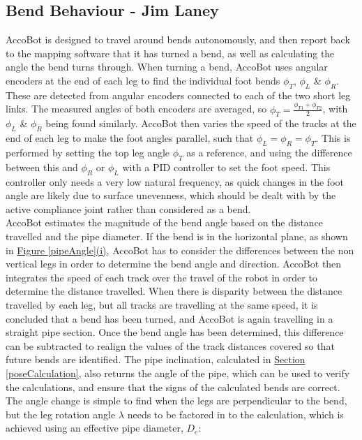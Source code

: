 \documentclass[11pt]{article}		%
\newcommand{\sectref}[1]{\hyperref[#1]{Section \ref*{#1}}}     %
\begin{document}
		\subsection[Bend Behaviour]{Bend Behaviour - Jim Laney}
			
			\begin{floatingfigure}[r]{0pt} \end{floatingfigure}
			
			AccoBot is designed to travel around bends autonomously, and then report back to the mapping software that it has turned a bend, as well as calculating the angle the bend turns through.
			When turning a bend, AccoBot uses angular encoders at the end of each leg to find the individual foot bends $\phi_T$, $\phi_L$ \& $\phi_R$.
			These are detected from angular encoders connected to each of the two short leg links.
			The measured angles of both encoders are averaged, so $\phi_T = \frac{\phi_{T1} + \phi_{T2}}{2}$, with $\phi_L$ \& $\phi_R$ being found similarly.
			AccoBot then varies the speed of the tracks at the end of each leg to make the foot angles parallel, such that $\phi_L = \phi_R = \phi_T$.
			This is performed by setting the top leg angle $\phi_T$ as a reference, and using the difference between this and $\phi_R$ or $\phi_L$ with a PID controller to set the foot speed.
			This controller only needs a very low natural frequency, as quick changes in the foot angle are likely due to surface unevenness, which should be dealt with by the active compliance joint rather than considered as a bend.
			\\
	        \hspace*{3ex}AccoBot estimates the magnitude of the bend angle based on the distance travelled and the pipe diameter.
			If the bend is in the horizontal plane, as shown in \hyperref[pipeAngle]{Figure \ref*{pipeAngle}(i)}, AccoBot has to consider the differences between the non vertical legs in order to determine the bend angle and direction.
			AccoBot then integrates the speed of each track over the travel of the robot in order to determine the distance travelled.
			When there is disparity between the distance travelled by each leg, but all tracks are travelling at the same speed, it is concluded that a bend has been turned, and AccoBot is again travelling in a straight pipe section.
			Once the bend angle has been determined, this difference can be subtracted to realign the values of the track distances covered so that future bends are identified.
			The pipe inclination, calculated in \sectref{poseCalculation}, also returns the angle of the pipe, which can be used to verify the calculations, and ensure that the signs of the calculated bends are correct.	
			\\
	        \hspace*{3ex}The angle change is simple to find when the legs are perpendicular to the bend, but the leg rotation angle $\lambda$ needs to be factored in to the calculation, which is achieved using an effective pipe diameter, $D_{e}$:
			
\end{document}
